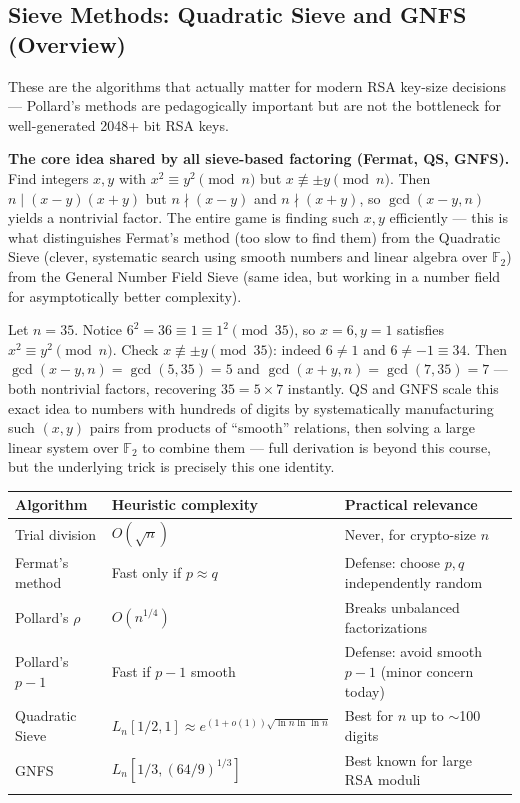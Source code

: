 \subsection{Sieve Methods: Quadratic Sieve and GNFS (Overview)}

These are the algorithms that actually matter for modern RSA key-size decisions — Pollard's methods are pedagogically important but are not the bottleneck for well-generated 2048+ bit RSA keys.

\medskip\noindent\textbf{The core idea shared by all sieve-based factoring (Fermat, QS, GNFS).} Find integers $x, y$ with $x^2 \equiv y^2 \pmod n$ but $x \not\equiv \pm y \pmod n$. Then $n \mid (x-y)(x+y)$ but $n \nmid (x-y)$ and $n \nmid (x+y)$, so $\gcd(x-y, n)$ yields a nontrivial factor. The entire game is finding such $x, y$ efficiently — this is what distinguishes Fermat's method (too slow to find them) from the Quadratic Sieve (clever, systematic search using smooth numbers and linear algebra over $\mathbb{F}_2$) from the General Number Field Sieve (same idea, but working in a number field for asymptotically better complexity).

\begin{example}
Let $n = 35$. Notice $6^2 = 36 \equiv 1 \equiv 1^2 \pmod{35}$, so $x=6, y=1$ satisfies $x^2 \equiv y^2 \pmod n$. Check $x \not\equiv \pm y \pmod{35}$: indeed $6 \ne 1$ and $6 \ne -1 \equiv 34$. Then $\gcd(x-y, n) = \gcd(5,35) = 5$ and $\gcd(x+y,n) = \gcd(7,35)=7$ — both nontrivial factors, recovering $35 = 5 \times 7$ instantly. QS and GNFS scale this exact idea to numbers with hundreds of digits by systematically manufacturing such $(x,y)$ pairs from products of ``smooth'' relations, then solving a large linear system over $\mathbb{F}_2$ to combine them — full derivation is beyond this course, but the underlying trick is precisely this one identity.
\end{example}

\begin{center}
\begin{tabular}{lll}
\toprule
\textbf{Algorithm} & \textbf{Heuristic complexity} & \textbf{Practical relevance} \\
\midrule
Trial division & $O(\sqrt{n})$ & Never, for crypto-size $n$ \\
Fermat's method & Fast only if $p \approx q$ & Defense: choose $p,q$ independently random \\
Pollard's $\rho$ & $O(n^{1/4})$ & Breaks unbalanced factorizations \\
Pollard's $p-1$ & Fast if $p-1$ smooth & Defense: avoid smooth $p-1$ (minor concern today) \\
Quadratic Sieve & $L_n[1/2, 1] \approx e^{(1+o(1))\sqrt{\ln n \ln \ln n}}$ & Best for $n$ up to $\sim$100 digits \\
GNFS & $L_n[1/3, (64/9)^{1/3}]$ & Best known for large RSA moduli \\
\bottomrule
\end{tabular}
\end{center}

